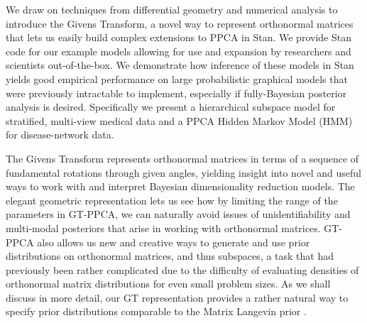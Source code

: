\documentclass{article}
\begin{document}
We draw on techniques from differential geometry and numerical analysis to introduce the Givens Transform, a novel way to represent orthonormal matrices that lets us easily build complex extensions to PPCA in Stan. We provide Stan code for our example models allowing for use and expansion by researchers and scientists out-of-the-box. We demonstrate how inference of these models in Stan yields good empirical performance on large probabilistic graphical models that were previously intractable to implement, especially if fully-Bayesian posterior analysis is desired. Specifically we present a hierarchical subspace model for stratified, multi-view medical data and a PPCA Hidden Markov Model (HMM) for disease-network data.

The Givens Transform represents orthonormal matrices in terms of a sequence of fundamental rotations through given angles, yielding insight into novel and useful ways to work with and interpret Bayesian dimensionality reduction models.  The elegant geometric representation lets us see how by limiting the range of the parameters in GT-PPCA, we can naturally avoid issues of unidentifiability and multi-modal posteriors that arise in working with orthonormal matrices.  GT-PPCA also allows us new and creative ways to generate and use prior distributions on orthonormal matrices, and thus subspaces, a task that had previously been rather complicated due to the difficulty of evaluating densities of orthonormal matrix distributions for even small problem sizes.  As we shall discuss in more detail, our GT representation provides a rather natural way to specify prior distributions comparable to the Matrix Langevin prior \citep{muirhead2009aspects}.

\end{document}
